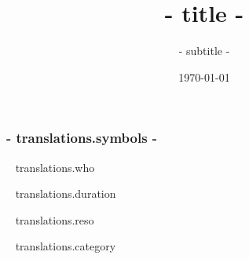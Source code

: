 \documentclass[aspectratio=169]{beamer}
\title{ {{- title -}} }
\subtitle{ {{- subtitle -}} }
\date{\today}
\begin{document}
\begin{frame}
\maketitle
\end{frame}

\begin{frame}
    \frametitle{ {{- translations.symbols -}} }

    \faUser~ {{ translations.who }}

    \faClock~ {{ translations.duration }}

    \faScroll~{{ translations.reso }}

    \faFilter~ {{ translations.category }}

\end{frame}
\end{document}
